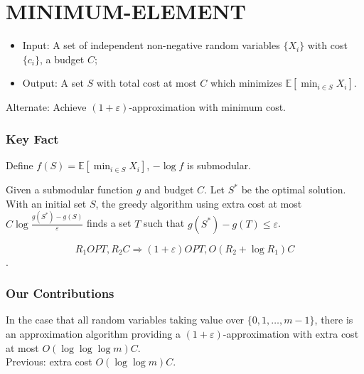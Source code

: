 \documentclass{beamer}
\newcommand{\Exp}{{\mathbb{E}}}
\newcommand{\mm}{{\textsf{MINIMUM-ELEMENT}}}
\begin{document}
\section{MINIMUM-ELEMENT}
\begin{frame}
    \begin{problem}[\mm]
        \begin{itemize}
            \item Input: A set of independent non-negative random variables $\{X_i\}$ with cost $\{c_i\}$, a budget $C$;
            \item Output: A set $S$ with total cost at most $C$ which minimizes $\Exp[\min_{i\in S} X_i]$.
        \end{itemize}
    \end{problem}
    \begin{spacing}{2.0}

    \end{spacing}
    Alternate: Achieve $(1+\varepsilon)$-approximation with minimum cost.
\end{frame}

\begin{frame}
    \frametitle{Key Fact}
    \begin{theorem}
        Define $f(S) =\Exp[ \min_{i\in S} X_i]$, $-\log f$ is submodular.
    \end{theorem}
    \begin{theorem}
        \label{thm:add-submod}
Given a submodular function $g$ and budget $C$. Let $S^*$ be the optimal solution. With an initial set $S$, the greedy algorithm using extra cost at most $C\log\frac{g(S^*) - g(S)}{\varepsilon}$ finds a set $T$ such that $g(S^*) - g(T) \leq \varepsilon$.
    \end{theorem}
    \begin{spacing}{2.0}

    \end{spacing}
    $$R_1 OPT, R_2 C \Longrightarrow (1+\varepsilon)OPT, O(R_2 + \log R_1) C$$.
\end{frame}

\begin{frame}
\frametitle{Our Contributions}
\begin{theorem}
    In the case that all random variables taking value over $\{0, 1, \ldots, m - 1\}$, there is an approximation algorithm providing a $(1+\varepsilon)$-approximation with extra cost at most $O(\log\log\log m)C$.\\
    {\color{blue} Previous: extra cost $O(\log\log m)C$.}
\end{theorem}
\end{frame}
\end{document}
